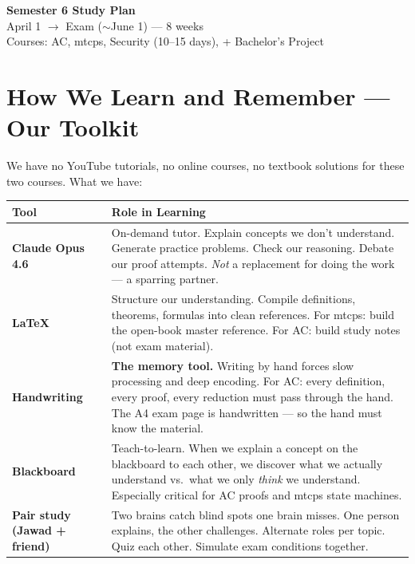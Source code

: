 \documentclass[11pt,a4paper]{article}
\begin{document}
\begin{center}
{\Huge\bfseries Semester 6 Study Plan}\\[0.5em]
{\large April 1 $\rightarrow$ Exam ($\sim$June 1) --- 8 weeks}\\[0.3em]
{\large Courses: AC, mtcps, Security (10--15 days), + Bachelor's Project}
\end{center}

\vspace{1em}

\section{How We Learn and Remember --- Our Toolkit}

We have no YouTube tutorials, no online courses, no textbook solutions for these two courses. What we have:

\begin{center}
\renewcommand{\arraystretch}{1.4}
\begin{tabular}{lp{10cm}}
\toprule
\textbf{Tool} & \textbf{Role in Learning} \\
\midrule
\textbf{Claude Opus 4.6} & On-demand tutor. Explain concepts we don't understand. Generate practice problems. Check our reasoning. Debate our proof attempts. \textit{Not} a replacement for doing the work --- a sparring partner. \\
\textbf{LaTeX} & Structure our understanding. Compile definitions, theorems, formulas into clean references. For mtcps: build the open-book master reference. For AC: build study notes (not exam material). \\
\textbf{Handwriting} & \textbf{The memory tool.} Writing by hand forces slow processing and deep encoding. For AC: every definition, every proof, every reduction must pass through the hand. The A4 exam page is handwritten --- so the hand must know the material. \\
\textbf{Blackboard} & Teach-to-learn. When we explain a concept on the blackboard to each other, we discover what we actually understand vs.\ what we only \textit{think} we understand. Especially critical for AC proofs and mtcps state machines. \\
\textbf{Pair study (Jawad + friend)} & Two brains catch blind spots one brain misses. One person explains, the other challenges. Alternate roles per topic. Quiz each other. Simulate exam conditions together. \\
\bottomrule
\end{tabular}
\end{center}
\end{document}
